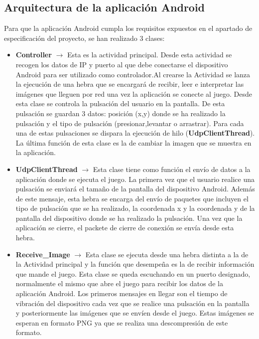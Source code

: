 \subsection {Arquitectura de la aplicaci\'on Android}

Para que la aplicaci\'on Android cumpla los requisitos expuestos en el apartado de especificaci\'on del proyecto, se han realizado 3 clases:

\begin {itemize}
\item \textbf{Controller} $\rightarrow$ Esta es la actividad principal. Desde esta actividad se recogen los datos de IP y puerto al que debe conectarse el dispositivo Android para ser utilizado como controlador.Al crearse la Actividad se lanza la ejecuci\'on de una hebra que se encargar\'a de recibir, leer e interpretar las im\'agenes que lleguen por red una vez la aplicaci\'on se conecte al juego. Desde esta clase se controla la pulsaci\'on del usuario en la pantalla. De esta pulsaci\'on se guardan 3 datos: posici\'on (x,y) donde se ha realizado la pulsaci\'on y el tipo de pulsaci\'on (presionar,levantar o arrastrar). Para cada una de estas pulsaciones se dispara la ejecuci\'on de hilo (\textbf{UdpClientThread}). La \'ultima funci\'on de esta clase es la de cambiar la imagen que se muestra en la aplicaci\'on. 
\item \textbf{UdpClientThread} $\rightarrow$ Esta clase tiene como funci\'on el env\'io de datos a la aplicaci\'on donde se ejecuta el juego. La primera vez que el usuario realice una pulsaci\'on se enviar\'a el tama\~no de la pantalla del dispositivo Android. Adem\'as de este mensaje, esta hebra se encarga del env\'io de paquetes que incluyen el tipo de pulsaci\'on que se ha realizado, la coordenada x y la coordenada y de la pantalla del dispositivo donde se ha realizado la pulsaci\'on. Una vez que la aplicaci\'on se cierre, el packete de cierre de conexi\'on se env\'ia desde esta hebra.
\item \textbf{Receive\_Image} $\rightarrow$ Esta clase se ejecuta desde una hebra distinta a la de la Actividad principal y la funci\'on que desempe\~na es la de recibir informaci\'on que mande el juego. Esta clase se queda escuchando en un puerto designado, normalmente el mismo que abre el juego para recibir los datos de la aplicaci\'on Android. Los primeros mensajes en llegar son el tiempo de vibraci\'on del dispositivo cada vez que se realice una pulsaci\'on en la pantalla y posteriormente las im\'agenes que se env\'ien desde el juego. Estas im\'agenes se esperan en formato PNG ya que se realiza una descompresi\'on de este formato.
\end {itemize}


